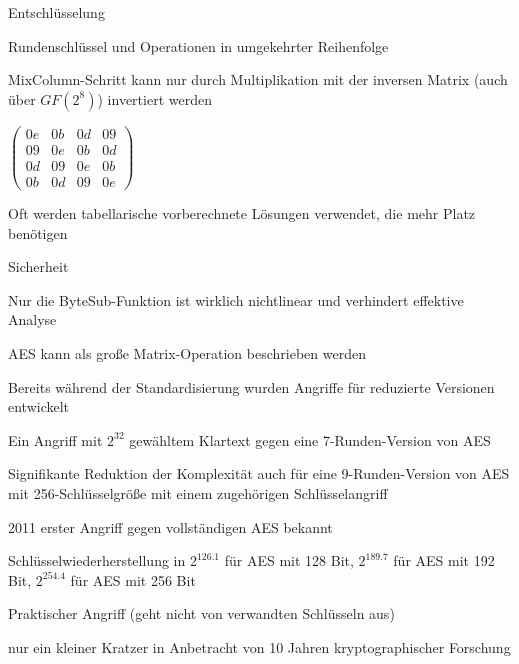 \documentclass[a4paper]{article}
\begin{document}
\begin{multicols}{3}
\begin{itemize*}
\begin{description*}
            \end{description*}
            \item Entschlüsselung
            \begin{itemize*}
                  \item Rundenschlüssel und Operationen in umgekehrter Reihenfolge
                  \item MixColumn-Schritt kann nur durch Multiplikation mit der inversen Matrix (auch über $GF(2^8)$) invertiert werden
                  \item $\begin{pmatrix} 0e&0b&0d&09\\ 09&0e&0b&0d\\ 0d&09&0e&0b\\ 0b&0d&09&0e \end{pmatrix}$
                  \item Oft werden tabellarische vorberechnete Lösungen verwendet, die mehr Platz benötigen
            \end{itemize*}
      \end{itemize*}

      Sicherheit
      \begin{itemize*}
            \item Nur die ByteSub-Funktion ist wirklich nichtlinear und verhindert effektive Analyse
            \item AES kann als große Matrix-Operation beschrieben werden
            \item Bereits während der Standardisierung wurden Angriffe für reduzierte Versionen entwickelt
            \begin{itemize*}
                  \item Ein Angriff mit $2^{32}$ gewähltem Klartext gegen eine 7-Runden-Version von AES
                  \item Signifikante Reduktion der Komplexität auch für eine 9-Runden-Version von AES mit 256-Schlüsselgröße mit einem zugehörigen Schlüsselangriff
            \end{itemize*}
            \item 2011 erster Angriff gegen vollständigen AES bekannt
            \begin{itemize*}
                  \item Schlüsselwiederherstellung in $2^{126.1}$ für AES mit 128 Bit, $2^{189.7}$ für AES mit 192 Bit, $2^{254.4}$ für AES mit 256 Bit
                  \item Praktischer Angriff (geht nicht von verwandten Schlüsseln aus)
                  \item nur ein kleiner Kratzer in Anbetracht von 10 Jahren kryptographischer Forschung
            \end{itemize*}
      \end{itemize*}


\end{multicols}
\end{document}
